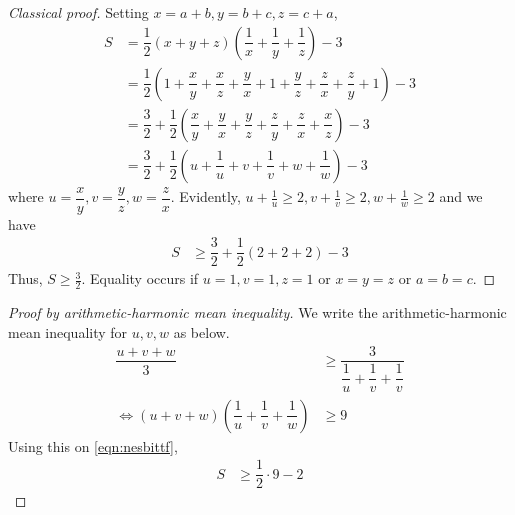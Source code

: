 \documentclass{subfile}
\begin{document}
		\begin{proof}[Classical proof]\label{proof:nesbittclassical}
			Setting $x=a+b,y=b+c,z=c+a$,
				\begin{align*}
					S
						& = \dfrac{1}{2}(x+y+z)\left(\dfrac{1}{x}+\dfrac{1}{y}+\dfrac{1}{z}\right)-3\\
						& = \dfrac{1}{2}\left(1+\dfrac{x}{y}+\dfrac{x}{z}+\dfrac{y}{x}+1+\dfrac{y}{z}+\dfrac{z}{x}+\dfrac{z}{y}+1\right)-3\\
						& = \dfrac{3}{2}+\dfrac{1}{2}\left(\dfrac{x}{y}+\dfrac{y}{x}+\dfrac{y}{z}+\dfrac{z}{y}+\dfrac{z}{x}+\dfrac{x}{z}\right)-3\\
						& = \dfrac{3}{2}+\dfrac{1}{2}\left(u+\dfrac{1}{u}+v+\dfrac{1}{v}+w+\dfrac{1}{w}\right)-3
				\end{align*}
			where $u=\dfrac{x}{y},v=\dfrac{y}{z},w=\dfrac{z}{x}$. Evidently, $u+\frac{1}{u}\geq2,v+\frac{1}{v}\geq2,w+\frac{1}{w}\geq2$ and we have
				\begin{align*}
					S
						& \geq\dfrac{3}{2}+\dfrac{1}{2}(2+2+2)-3
				\end{align*}
			Thus, $S\geq\frac{3}{2}$. Equality occurs if $u=1,v=1,z=1$ or $x=y=z$ or $a=b=c$.
		\end{proof}
	
		\begin{proof}[Proof by arithmetic-harmonic mean inequality]
			We write the arithmetic-harmonic mean inequality for $u,v,w$ as below.
				\begin{align*}
					\dfrac{u+v+w}{3}
						& \geq\dfrac{3}{\dfrac{1}{u}+\dfrac{1}{v}+\dfrac{1}{v}}\\
					\iff(u+v+w)\left(\dfrac{1}{u}+\dfrac{1}{v}+\dfrac{1}{w}\right)
						& \geq9
				\end{align*}
			Using this on \ref{eqn:nesbittf},
				\begin{align*}
					S
						& \geq\dfrac{1}{2}\cdot9-2
				\end{align*}
		\end{proof}
	
\end{document}
